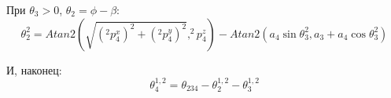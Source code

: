 При $\theta_3 > 0$, $\theta_2 = \phi - \beta$:
\begin{equation}
	\theta_2^2 = Atan2(\sqrt{(^2p_4^x)^2 + (^2p_4^y)^2}, ^2p_4^z) - Atan2(a_4 \sin{\theta_3^2}, a_3 + a_4 \cos{\theta_3^2})
\end{equation}

И, наконец:
\begin{equation}
	\theta_4^{1,2} = \theta_{234} - \theta_{2}^{1,2} - \theta_{3}^{1,2}
\end{equation}



\newpage